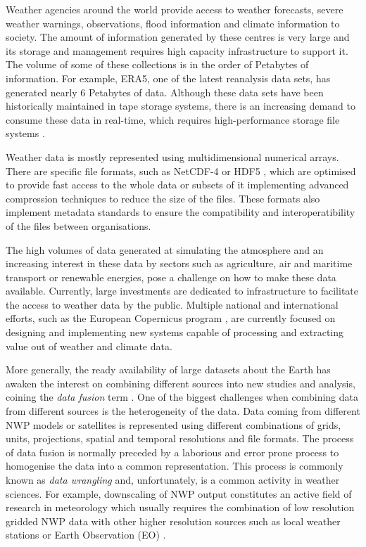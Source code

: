 \medskip

Weather agencies around the world provide access to weather forecasts, severe weather warnings, observations, flood information and climate information to society. The amount of information generated by these centres is very large and its storage and management requires high capacity infrastructure to support it. The volume of some of these collections is in the order of Petabytes of information. For example, ERA5, one of the latest reanalysis data sets, has generated nearly 6 Petabytes of data. Although these data sets have been historically maintained in tape storage systems, there is an increasing demand to consume these data in real-time, which requires high-performance storage file systems \citep{evans2015nci}.

\medskip

Weather data is mostly represented using multidimensional numerical arrays. There are specific file formats, such as NetCDF-4 \citep{rew2006netcdf} or HDF5 \citep{folk2011overview}, which are optimised to provide fast access to the whole data or subsets of it implementing advanced compression techniques to reduce the size of the files. These formats also implement metadata standards to ensure the compatibility and interoperatibility of the files between organisations.

\medskip

The high volumes of data generated at simulating the atmosphere and an increasing interest in these data by sectors such as agriculture, air and maritime transport or renewable energies, pose a challenge on how to make these data available. Currently, large investments are dedicated to infrastructure to facilitate the access to weather data by the public. Multiple national and international efforts, such as the European Copernicus program \citep{copernicus}, are currently focused on designing and implementing new systems capable of processing and extracting value out of weather and climate data.

\medskip

More generally, the ready availability of large datasets about the Earth has awaken the interest on combining different sources into new studies and analysis, coining the \textit{data fusion} term \citep{wald1999some}. One of the biggest challenges when combining data from different sources is the heterogeneity of the data. Data coming from different NWP models or satellites is represented using different combinations of grids, units, projections, spatial and temporal resolutions and file formats. The process of data fusion is normally preceded by a laborious and error prone process to homogenise the data into a common representation. This process is commonly known as \textit{data wrangling} \citep{goldston2008big} and, unfortunately, is a common activity in weather sciences. For example, downscaling of NWP output constitutes an active field of research in meteorology which usually requires the combination of low resolution gridded NWP data with other higher resolution sources such as local weather stations or Earth Observation (EO) \citep{giebel2011state,renzullo2016improved}.

